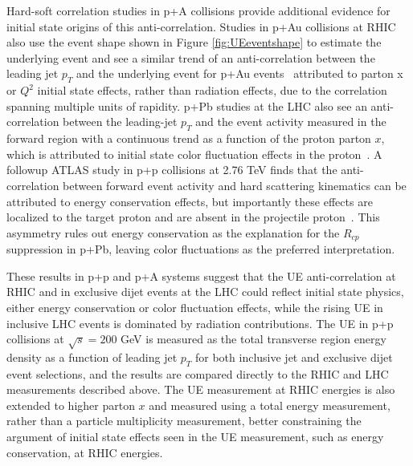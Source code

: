 Hard-soft correlation studies in p+A collisions provide additional evidence for initial state origins of this anti-correlation. Studies in p+Au collisions at RHIC also use the event shape shown in Figure \ref{fig:UEeventshape} to estimate the underlying event and see a similar trend of an anti-correlation between the leading jet $p_{T}$ and the underlying event for p+Au events~\cite{star_ue_pAu} attributed to parton x or $Q^2$ initial state effects, rather than radiation effects, due to the correlation spanning multiple units of rapidity. 
p+Pb studies at the LHC also see an anti-correlation between the leading-jet $p_{T}$ and the event activity measured in the forward region with a continuous trend as a function of the proton parton $x$, which is attributed to initial state color fluctuation effects in the proton~\cite{ATLAS:2024dijet_centrality_pPb_816tev}. 
A followup ATLAS study in p+p collisions at 2.76 TeV finds that the anti-correlation between forward event activity and hard scattering kinematics can be attributed to energy conservation effects, but importantly these effects are localized to the target proton and are absent in the projectile proton~\cite{ATLAS:2016transverse_energy_pp_276tev}. This asymmetry rules out energy conservation as the explanation for the $R_{cp}$ suppression in p+Pb, leaving color fluctuations as the preferred interpretation. 

These results in p+p and p+A systems suggest that the UE anti-correlation at RHIC and in exclusive dijet events at the LHC could reflect initial state physics, either energy conservation or color fluctuation effects, while the rising UE in inclusive LHC events is dominated by radiation contributions. 
The UE in p+p collisions at $\sqrt{s} = 200$ GeV is measured as the total transverse region energy density as a function of leading jet $p_T$ for both inclusive jet and exclusive dijet event selections, and the results are compared directly to the RHIC and LHC measurements described above. 
The UE measurement at RHIC energies is also extended to higher parton $x$ and measured using a total energy measurement, rather than a particle multiplicity measurement, better constraining the argument of initial state effects seen in the UE measurement, such as energy conservation, at RHIC energies. 

